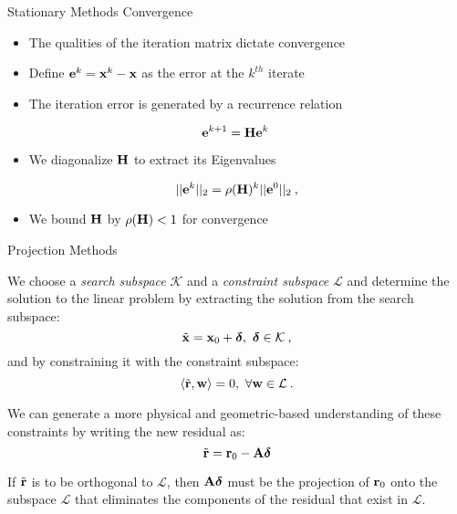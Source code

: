 \documentclass{beamer}
\begin{document}
\begin{frame}{Stationary Methods Convergence}

  \begin{itemize}
  \item The qualities of the iteration matrix dictate convergence 
  \item Define $\mathbf{e}^k = \mathbf{x}^k-\mathbf{x}$ as the error at the
    $k^{th}$ iterate
  \item The iteration error is generated by a recurrence relation
  \end{itemize}

  \[
  \mathbf{e}^{k+1} = \mathbf{H} \mathbf{e}^k\:
  \]


  \begin{itemize}
  \item We diagonalize $\mathbf{H}$ to extract its Eigenvalues
  \end{itemize}

  \[
  ||\mathbf{e}^{k}||_2 = \rho(\mathbf{H})^k ||\mathbf{e}^0||_2\:,
  \]

  \begin{itemize}
  \item We bound $\mathbf{H}$ by $\rho(\mathbf{H}) < 1$ for convergence
  \end{itemize}

\end{frame}

\begin{frame}{Projection Methods}

  We choose a \textit{search subspace} $\mathcal{K}$ and a
  \textit{constraint subspace} $\mathcal{L}$ and determine the solution
  to the linear problem by extracting the solution from the search
  subspace:
  \[
  \tilde{\mathbf{x}} = \mathbf{x}_0 +
  \boldsymbol{\delta},\ \boldsymbol{\delta} \in \mathcal{K}\:,
  \]
  and by constraining it with the constraint subspace:
  \[
  \langle \tilde{\ve{r}},\ve{w} \rangle = 0,\ \forall \ve{w} \in
  \mathcal{L}\:.
  \]

  We can generate a more physical and geometric-based understanding of
  these constraints by writing the new residual as:
  \[
  \tilde{\mathbf{r}} = \mathbf{r}_0 - \mathbf{A}\boldsymbol{\delta}
  \]

  If $\tilde{\mathbf{r}}$ is to be orthogonal to $\mathcal{L}$, then
  $\mathbf{A}\boldsymbol{\delta}$ must be the projection of $\mathbf{r}_0$
  onto the subspace $\mathcal{L}$ that eliminates the components of
  the residual that exist in $\mathcal{L}$.

\end{frame}
\end{document}
